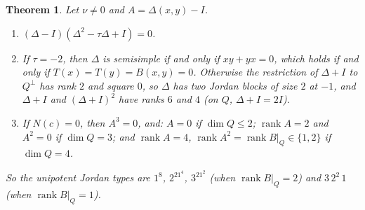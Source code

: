 \documentclass[11pt]{amsart}
\newtheorem{theorem}{Theorem}[section]
\theoremstyle{definition}
\theoremstyle{remark}
\DeclareMathOperator{\rank}{rank}
\begin{document}
\begin{theorem}\label{thm:jordan}
Let $\nu\neq0$ and $A=\Delta(x,y)-I$.
\begin{enumerate}[label=\textup{(\alph*)}]
\item $(\Delta-I)(\Delta^2-\tau\Delta+I)=0$.
\item If $\tau=-2$, then $\Delta$ is semisimple if and only if $xy+yx=0$, which
  holds if and only if $T(x)=T(y)=B(x,y)=0$. Otherwise the restriction of
  $\Delta+I$ to $Q^\perp$ has rank $2$ and square $0$, so $\Delta$ has two
  Jordan blocks of size $2$ at $-1$, and $\Delta+I$ and $(\Delta+I)^2$ have
  ranks $6$ and $4$ (on $Q$, $\Delta+I=2I$).
\item If $N(c)=0$, then $A^3=0$, and: $A=0$ if $\dim Q\le2$; $\rank A=2$ and
  $A^2=0$ if $\dim Q=3$; and $\rank A=4$, $\rank A^2=\rank B|_Q\in\{1,2\}$ if
  $\dim Q=4$.
\end{enumerate}
So the unipotent Jordan types are $1^8$, $2^21^4$, $3^21^2$ (when
$\rank B|_Q=2$) and $3\,2^2\,1$ (when $\rank B|_Q=1$).
\end{theorem}
\end{document}
